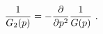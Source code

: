 \begin{equation}\label{1.22}
{1 \over G_2(p)}=-{\partial \over \partial p^2}{1 \over G(p)}~.
\end{equation}

